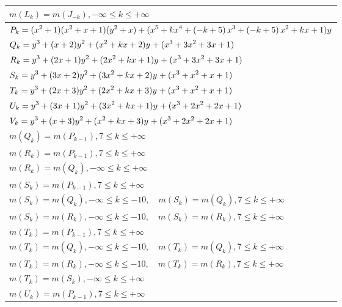 \documentclass{amsart}
\begin{document}
\begin{longtable}{|l|}
\(\displaystyle m(L_k) = m(J_{-k}),-\infty \leqslant k \leqslant +\infty\)\\
\hline
\(\displaystyle P_k=(x^2
 + 1)(x^2
 + x
 + 1)(y^2+x)+(x^5
 + k\*x^4
 + \left(-k
 + 5\right) \*x^3
 + \left(-k
 + 5\right) \*x^2
 + k\*x
 + 1)y\)\\
\(\displaystyle Q_k=y^{3}+(x
 + 2)y^{2}+(x^2
 + k\*x
 + 2)y^{}+(x^3
 + 3\*x^2
 + 3\*x
 + 1)\)\\
\(\displaystyle R_k=y^{3}+(2\*x
 + 1)y^{2}+(2\*x^2
 + k\*x
 + 1)y^{}+(x^3
 + 3\*x^2
 + 3\*x
 + 1)\)\\
\(\displaystyle S_k=y^{3}+(3\*x
 + 2)y^{2}+(3\*x^2
 + k\*x
 + 2)y^{}+(x^3
 + x^2
 + x
 + 1)\)\\
\(\displaystyle T_k=y^{3}+(2\*x
 + 3)y^{2}+(2\*x^2
 + k\*x
 + 3)y^{}+(x^3
 + x^2
 + x
 + 1)\)\\
\(\displaystyle U_k=y^{3}+(3\*x
 + 1)y^{2}+(3\*x^2
 + k\*x
 + 1)y^{}+(x^3
 + 2\*x^2
 + 2\*x
 + 1)\)\\
\(\displaystyle V_k=y^{3}+(x
 + 3)y^{2}+(x^2
 + k\*x
 + 3)y^{}+(x^3
 + 2\*x^2
 + 2\*x
 + 1)\)\\
\(\displaystyle m(Q_k) = m(P_{k
 - 1}),7 \leqslant k \leqslant +\infty\)\\
\(\displaystyle m(R_k) = m(P_{k
 - 1}),7 \leqslant k \leqslant +\infty\)\\
\(\displaystyle m(R_k) = m(Q_{k}),-\infty \leqslant k \leqslant +\infty\)\\
\(\displaystyle m(S_k) = m(P_{k
 - 1}),7 \leqslant k \leqslant +\infty\)\\
\(\displaystyle m(S_k) = m(Q_{k}),-\infty \leqslant k \leqslant -10,\quad m(S_k) = m(Q_{k}),7 \leqslant k \leqslant +\infty\)\\
\(\displaystyle m(S_k) = m(R_{k}),-\infty \leqslant k \leqslant -10,\quad m(S_k) = m(R_{k}),7 \leqslant k \leqslant +\infty\)\\
\(\displaystyle m(T_k) = m(P_{k
 - 1}),7 \leqslant k \leqslant +\infty\)\\
\(\displaystyle m(T_k) = m(Q_{k}),-\infty \leqslant k \leqslant -10,\quad m(T_k) = m(Q_{k}),7 \leqslant k \leqslant +\infty\)\\
\(\displaystyle m(T_k) = m(R_{k}),-\infty \leqslant k \leqslant -10,\quad m(T_k) = m(R_{k}),7 \leqslant k \leqslant +\infty\)\\
\(\displaystyle m(T_k) = m(S_{k}),-\infty \leqslant k \leqslant +\infty\)\\
\(\displaystyle m(U_k) = m(P_{k
 - 1}),7 \leqslant k \leqslant +\infty\)\\

\end{longtable}
\end{document}
